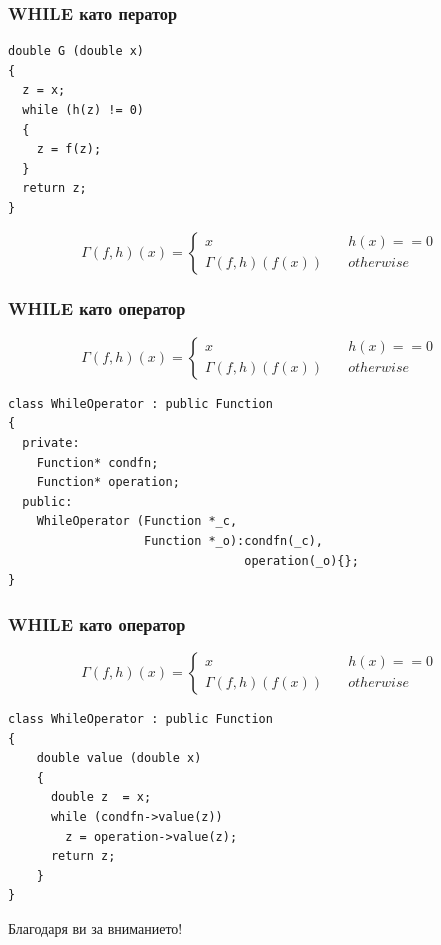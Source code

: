 \documentclass{beamer}
\begin{document}
\begin{frame}[fragile]
\frametitle{WHILE като ператор}

\begin{center}

\begin{lstlisting}
double G (double x)
{
  z = x;
  while (h(z) != 0)
  {
    z = f(z);
  }
  return z;
}
\end{lstlisting}
  
\end{center}


$$
\Gamma(f,h)(x) = \left\{
        \begin{array}{ll}
            x & \quad h(x) == 0 \\
            \Gamma(f,h)(f(x)) & \quad otherwise
        \end{array}
    \right.
$$



\end{frame}


\begin{frame}[fragile]
\frametitle{WHILE като оператор}

\begin{center}
$$
\Gamma(f,h)(x) = \left\{
        \begin{array}{ll}
            x & \quad h(x) == 0 \\
            \Gamma(f,h)(f(x)) & \quad otherwise
        \end{array}
    \right.
$$


\begin{lstlisting}
class WhileOperator : public Function
{
  private:
    Function* condfn;
    Function* operation;
  public:
    WhileOperator (Function *_c, 
                   Function *_o):condfn(_c),
                                 operation(_o){};
}
\end{lstlisting}
  
\end{center}


\end{frame}



\begin{frame}[fragile]
\frametitle{WHILE като оператор}

\begin{center}

$$
\Gamma(f,h)(x) = \left\{
        \begin{array}{ll}
            x & \quad h(x) == 0 \\
            \Gamma(f,h)(f(x)) & \quad otherwise
        \end{array}
    \right.
$$


\begin{lstlisting}
class WhileOperator : public Function
{
    double value (double x)
    {
      double z  = x;
      while (condfn->value(z))
        z = operation->value(z);
      return z;
    }
}
\end{lstlisting}
  
\end{center}


\end{frame}


\begin{frame}
\centerline{Благодаря ви за вниманието!}
\end{frame}
\end{document}
